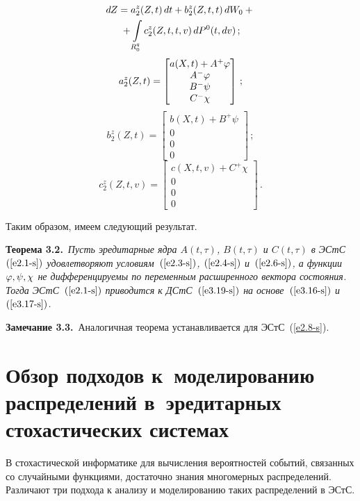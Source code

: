 \begin{multicols}{2}
\vspace*{-12pt}

\noindent
\begin{multline}
 dZ= a_2^z (Z,t) \,dt+ b_2^z(Z,t,t)\, dW_0 +{}\\
 {}+\int\limits_{R_0^q} c_2^z (Z,t,t,v)\,dP^0 (t, dv)\,;
 \label{e3.19-s}
 \end{multline}
        $$a^z_2 (Z,t)=\begin{bmatrix}
        a(X,t)+A^+\varphi\\
        A^-\varphi\\
        B^- \psi\\
        C^-\chi\end{bmatrix}\,;$$
        $$
    b^z_2 (Z,t)=\begin{bmatrix}
        b(X,t)+B^+\psi\\
        0\\
        0\\
        0\end{bmatrix}\,;$$
$$
c^z_2 (Z,t,v)=\begin{bmatrix}
        c(X,t,v)+C^+\chi\\
        0\\
        0\\
        0\end{bmatrix}\,. %
  $$

Таким образом, имеем следующий результат.

\medskip

\noindent
\textbf{Теорема 3.2.}\ 
\textit{Пусть эредитарные ядра $A(t,\tau)$, $B(t,\tau)$ и $C(t,\tau)$ в ЭСтС~$(\ref{e2.1-s})$ 
удовлетворяют условиям~$(\ref{e2.3-s})$, $(\ref{e2.4-s})$ и~$(\ref{e2.6-s})$, 
а функции $\varphi, \psi, \chi$ не дифференцируемы по переменным расширенного 
вектора состояния. Тогда ЭСтС~$(\ref{e2.1-s})$ 
приводится к ДСтС~$(\ref{e3.19-s})$ на основе~$(\ref{e3.16-s})$ и~$(\ref{e3.17-s})$.}

\noindent
\textbf{Замечание 3.3.}\
Аналогичная теорема устанавливается для ЭСтС~(\ref{e2.8-s}).


\section{Обзор подходов к~моделированию распределений в~эредитарных
стохастических системах}


В стохастической информатике для вычисления вероятностей событий, 
связанных со случайными функциями, достаточно знания многомерных распределений. 
Различают три подхода к анализу и моделированию таких распределений в ЭСтС.


\end{multicols}
